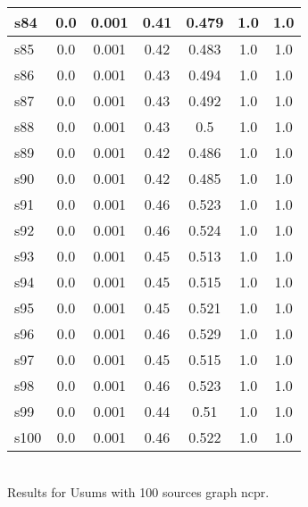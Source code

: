 \documentclass{article}
\begin{document}
\begin{tabular}{|l|c|c|c|c|c|c|}
s84 &0.0 & 0.001 & 0.41 & 0.479 & 1.0 & 1.0\\
\hline
s85 &0.0 & 0.001 & 0.42 & 0.483 & 1.0 & 1.0\\
\hline
s86 &0.0 & 0.001 & 0.43 & 0.494 & 1.0 & 1.0\\
\hline
s87 &0.0 & 0.001 & 0.43 & 0.492 & 1.0 & 1.0\\
\hline
s88 &0.0 & 0.001 & 0.43 & 0.5 & 1.0 & 1.0\\
\hline
s89 &0.0 & 0.001 & 0.42 & 0.486 & 1.0 & 1.0\\
\hline
s90 &0.0 & 0.001 & 0.42 & 0.485 & 1.0 & 1.0\\
\hline
s91 &0.0 & 0.001 & 0.46 & 0.523 & 1.0 & 1.0\\
\hline
s92 &0.0 & 0.001 & 0.46 & 0.524 & 1.0 & 1.0\\
\hline
s93 &0.0 & 0.001 & 0.45 & 0.513 & 1.0 & 1.0\\
\hline
s94 &0.0 & 0.001 & 0.45 & 0.515 & 1.0 & 1.0\\
\hline
s95 &0.0 & 0.001 & 0.45 & 0.521 & 1.0 & 1.0\\
\hline
s96 &0.0 & 0.001 & 0.46 & 0.529 & 1.0 & 1.0\\
\hline
s97 &0.0 & 0.001 & 0.45 & 0.515 & 1.0 & 1.0\\
\hline
s98 &0.0 & 0.001 & 0.46 & 0.523 & 1.0 & 1.0\\
\hline
s99 &0.0 & 0.001 & 0.44 & 0.51 & 1.0 & 1.0\\
\hline
s100 &0.0 & 0.001 & 0.46 & 0.522 & 1.0 & 1.0\\
\hline
\end{tabular}\\

\noindent Results for Usums with 100 sources graph ncpr.
\end{document}
